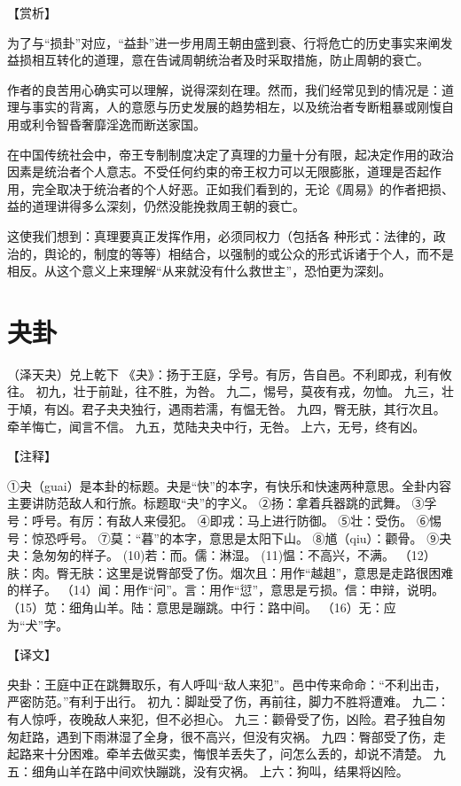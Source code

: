 \documentclass[12pt,UTF8]{ctexbook}
\begin{document}
【赏析】

为了与“损卦”对应，“益卦”进一步用周王朝由盛到衰、行将危亡的历史事实来阐发益损相互转化的道理，意在告诫周朝统治者及时采取措施，防止周朝的衰亡。

作者的良苦用心确实可以理解，说得深刻在理。然而，我们经常见到的情况是：道理与事实的背离，人的意愿与历史发展的趋势相左，以及统治者专断粗暴或刚愎自用或利令智昏奢靡淫逸而断送家国。

在中国传统社会中，帝王专制制度决定了真理的力量十分有限，起决定作用的政治因素是统治者个人意志。不受任何约束的帝王权力可以无限膨胀，道理是否起作用，完全取决于统治者的个人好恶。正如我们看到的，无论《周易》的作者把损、益的道理讲得多么深刻，仍然没能挽救周王朝的衰亡。

这使我们想到：真理要真正发挥作用，必须同权力（包括各 种形式：法律的，政治的，舆论的，制度的等等）相结合，以强制的或公众的形式诉诸于个人，而不是相反。从这个意义上来理解“从来就没有什么救世主”，恐怕更为深刻。

\chapter{夬卦}

（泽天夬）兑上乾下
《夬》：扬于王庭，孚号。有厉，告自邑。不利即戎，利有攸往。
初九，壮于前趾，往不胜，为咎。
九二，惕号，莫夜有戎，勿恤。
九三，壮于頄，有凶。君子夬夬独行，遇雨若濡，有愠无咎。
九四，臀无肤，其行次且。牵羊悔亡，闻言不信。
九五，苋陆夬夬中行，无咎。
上六，无号，终有凶。

【注释】

①夬（guai）是本卦的标题。夬是“快”的本字，有快乐和快速两种意思。全卦内容主要讲防范敌人和行旅。标题取“夬”的字义。
②扬：拿着兵器跳的武舞。
③孚号：呼号。有厉：有敌人来侵犯。
④即戎：马上进行防御。
⑤壮：受伤。
⑥惕号：惊恐呼号。
⑦莫：“暮”的本字，意思是太阳下山。
⑧馗（qiu）：颧骨。
⑨夬夬：急匆匆的样子。
(10)若：而。儒：淋湿。
(11)愠：不高兴，不满。
（12）肤：肉。臀无肤：这里是说臀部受了伤。烟次且：用作“越趄”，意思是走路很困难的样子。
（14）闻：用作“问”。言：用作“愆”，意思是亏损。信：申辩，说明。
（15）苋：细角山羊。陆：意思是蹦跳。中行：路中间。
（16）无：应为“犬”字。

【译文】

央卦：王庭中正在跳舞取乐，有人呼叫“敌人来犯”。邑中传来命命：“不利出击，严密防范。”有利于出行。
初九：脚趾受了伤，再前往，脚力不胜将遭难。
九二：有人惊呼，夜晚敌人来犯，但不必担心。
九三：颧骨受了伤，凶险。君子独自匆匆赶路，遇到下雨淋湿了全身，很不高兴，但没有灾祸。
九四：臀部受了伤，走起路来十分困难。牵羊去做买卖，悔恨羊丢失了，问怎么丢的，却说不清楚。
九五：细角山羊在路中间欢快蹦跳，没有灾祸。
上六：狗叫，结果将凶险。
\end{document}
